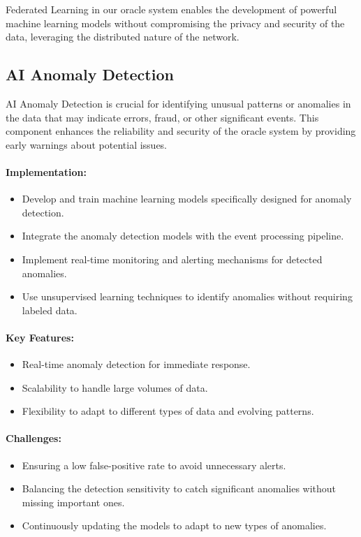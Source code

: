 \documentclass[12pt,a4paper]{article}
\begin{document}
Federated Learning in our oracle system enables the development of powerful machine learning models without compromising the privacy and security of the data, leveraging the distributed nature of the network.
	
	\subsection{AI Anomaly Detection}
	AI Anomaly Detection is crucial for identifying unusual patterns or anomalies in the data that may indicate errors, fraud, or other significant events. This component enhances the reliability and security of the oracle system by providing early warnings about potential issues.
	
	\paragraph{Implementation:}
	\begin{itemize}
		\item Develop and train machine learning models specifically designed for anomaly detection.
		\item Integrate the anomaly detection models with the event processing pipeline.
		\item Implement real-time monitoring and alerting mechanisms for detected anomalies.
		\item Use unsupervised learning techniques to identify anomalies without requiring labeled data.
	\end{itemize}
	
	\paragraph{Key Features:}
	\begin{itemize}
		\item Real-time anomaly detection for immediate response.
		\item Scalability to handle large volumes of data.
		\item Flexibility to adapt to different types of data and evolving patterns.
	\end{itemize}
	
	\paragraph{Challenges:}
	\begin{itemize}
		\item Ensuring a low false-positive rate to avoid unnecessary alerts.
		\item Balancing the detection sensitivity to catch significant anomalies without missing important ones.
		\item Continuously updating the models to adapt to new types of anomalies.
	\end{itemize}
	
\end{document}
